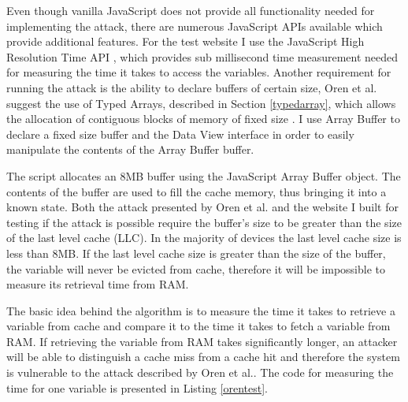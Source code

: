 \documentclass[10pt,a4paper,twoside]{book}
\begin{document}
Even though vanilla JavaScript does not provide all functionality needed for implementing the attack, there are numerous JavaScript APIs available which provide additional features. For the test website I use the JavaScript High Resolution Time API \cite{jshighresolutiontimeapi}, which provides sub millisecond time measurement needed for measuring the time it takes to access the variables. Another requirement for running the attack is the ability to declare buffers of certain size, Oren et al. suggest the use of Typed Arrays, described in Section \ref{typedarray}, which allows the allocation of contiguous blocks of memory of fixed size \cite{typedarrays}. I use Array Buffer \cite{arraybuffer} to declare a fixed size buffer and the Data View \cite{dataview} interface in order to easily manipulate the contents of the Array Buffer buffer. 

The script allocates an 8MB buffer using the JavaScript Array Buffer object. The contents of the buffer are used to fill the cache memory, thus bringing it into a known state. Both the attack presented by Oren et al. \cite{oren2015spy} and the website I built for testing if the attack is possible require the buffer's size to be greater than the size of the last level cache (LLC). In the majority of devices the last level cache size is less than 8MB. If the last level cache size is greater than the size of the buffer, the variable will never be evicted from cache, therefore it will be impossible to measure its retrieval time from RAM.

The basic idea behind the algorithm is to measure the time it takes to retrieve a variable from cache and compare it to the time it takes to fetch a variable from RAM. If retrieving the variable from RAM takes significantly longer, an attacker will be able to distinguish a cache miss from a cache hit and therefore the system is vulnerable to the attack described by Oren et al.\cite{oren2015spy}. The code for measuring the time for one variable is presented in Listing \ref{orentest}.

\end{document}
